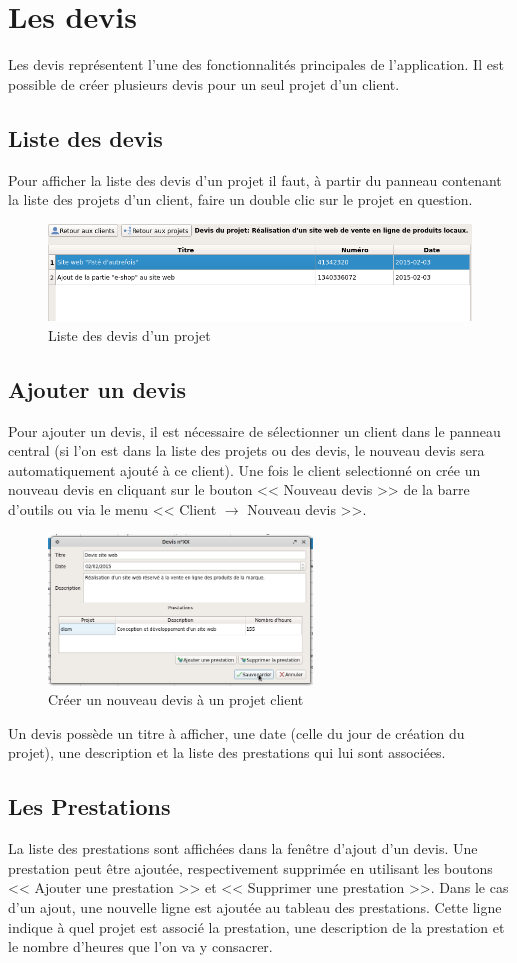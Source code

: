 \chapter{Les devis}
Les devis représentent l'une des fonctionnalités principales de l'application. Il est possible de créer plusieurs devis pour un seul projet d'un client. 
\section{Liste des devis}
Pour afficher la liste des devis d'un projet il faut, à partir du panneau contenant la liste des projets d'un client, faire un double clic sur le projet en question.
\begin{figure}[H]
	\centering
	\includegraphics[width=12cm]{screens/ihmDevis.png}
	\caption{Liste des devis d'un projet}
\end{figure}

\section{Ajouter un devis}
Pour ajouter un devis, il est nécessaire de sélectionner un client dans le panneau central (si l'on est dans la liste des projets ou des devis, le nouveau devis sera automatiquement ajouté à ce client). Une fois le client selectionné on crée un nouveau devis en cliquant sur le bouton << Nouveau devis >> de la barre d'outils ou via le menu << Client $\rightarrow$ Nouveau devis >>. 
\begin{figure}[H]
	\centering
	\includegraphics[width=7cm]{screens/creerDevis.png}
	\caption{Créer un nouveau devis à un projet client}
\end{figure}
Un devis possède un titre à afficher, une date (celle du jour de création du projet), une description et la liste des prestations qui lui sont associées. 
\section{Les Prestations}
La liste des prestations sont affichées dans la fenêtre d'ajout d'un devis. Une prestation peut être ajoutée, respectivement supprimée en utilisant les boutons << Ajouter une prestation >> et << Supprimer une prestation >>. Dans le cas d'un ajout, une nouvelle ligne est ajoutée au tableau des prestations. Cette ligne indique à quel projet est associé la prestation, une description de la prestation et le nombre d'heures que l'on va y consacrer. 